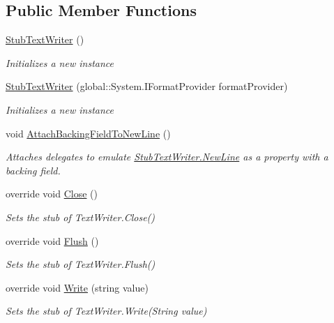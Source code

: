 \subsection*{Public Member Functions}
\begin{DoxyCompactItemize}
\item 
\hyperlink{class_system_1_1_i_o_1_1_fakes_1_1_stub_text_writer_aae7cd88b42e91ae81ac51edcf4c1bbc4}{Stub\-Text\-Writer} ()
\begin{DoxyCompactList}\small\item\em Initializes a new instance\end{DoxyCompactList}\item 
\hyperlink{class_system_1_1_i_o_1_1_fakes_1_1_stub_text_writer_a67f469b0e440d1508703ffaa171d59d5}{Stub\-Text\-Writer} (global\-::\-System.\-I\-Format\-Provider format\-Provider)
\begin{DoxyCompactList}\small\item\em Initializes a new instance\end{DoxyCompactList}\item 
void \hyperlink{class_system_1_1_i_o_1_1_fakes_1_1_stub_text_writer_ab329f3463dc146714e774b2f038dab08}{Attach\-Backing\-Field\-To\-New\-Line} ()
\begin{DoxyCompactList}\small\item\em Attaches delegates to emulate \hyperlink{class_system_1_1_i_o_1_1_fakes_1_1_stub_text_writer_a0ecaa25da7e3b9cb9c264c571a996381}{Stub\-Text\-Writer.\-New\-Line} as a property with a backing field.\end{DoxyCompactList}\item 
override void \hyperlink{class_system_1_1_i_o_1_1_fakes_1_1_stub_text_writer_a34777d12f859f1e7a3985d58960d0693}{Close} ()
\begin{DoxyCompactList}\small\item\em Sets the stub of Text\-Writer.\-Close()\end{DoxyCompactList}\item 
override void \hyperlink{class_system_1_1_i_o_1_1_fakes_1_1_stub_text_writer_a314725fd5967df4b2ab9008bea7c011c}{Flush} ()
\begin{DoxyCompactList}\small\item\em Sets the stub of Text\-Writer.\-Flush()\end{DoxyCompactList}\item 
override void \hyperlink{class_system_1_1_i_o_1_1_fakes_1_1_stub_text_writer_abd2db5800f3c73d61e6da7130db742de}{Write} (string value)
\begin{DoxyCompactList}\small\item\em Sets the stub of Text\-Writer.\-Write(\-String value)\end{DoxyCompactList}\item 

\end{DoxyCompactItemize}
